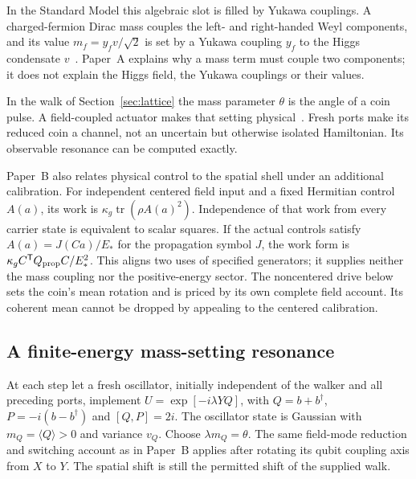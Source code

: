 \documentclass[12pt,a4paper]{article}
\theoremstyle{definition}
\theoremstyle{remark}
\begin{document}
In the Standard Model this algebraic slot is filled by Yukawa couplings. A charged-fermion Dirac mass couples the left- and right-handed Weyl components, and its value $m_f=y_fv/\sqrt2$ is set by a Yukawa coupling $y_f$ to the Higgs condensate $v$~\cite{PeskinSchroeder1995,WeinbergQFT2}. Paper~A explains why a mass term must couple two components; it does not explain the Higgs field, the Yukawa couplings or their values.

In the walk of Section~\ref{sec:lattice} the mass parameter $\theta$ is the angle of a coin pulse. A field-coupled actuator makes that setting physical~\cite{Liu2026QRAIFB}. Fresh ports make its reduced coin a channel, not an uncertain but otherwise isolated Hamiltonian. Its observable resonance can be computed exactly.

Paper~B also relates physical control to the spatial shell under an additional calibration. For independent centered field input and a fixed Hermitian control $A(a)$, its work is $\kappa_g\operatorname{tr}(\rho A(a)^2)$. Independence of that work from every carrier state is equivalent to scalar squares. If the actual controls satisfy $A(a)=J(Ca)/E_*$ for the propagation symbol $J$, the work form is $\kappa_g C^{\mathsf T}Q_{\rm prop}C/E_*^2$. This aligns two uses of specified generators; it supplies neither the mass coupling nor the positive-energy sector. The noncentered drive below sets the coin's mean rotation and is priced by its own complete field account. Its coherent mean cannot be dropped by appealing to the centered calibration.

\subsection{A finite-energy mass-setting resonance}
\label{sec:field-coin}

At each step let a fresh oscillator, initially independent of the walker and
all preceding ports, implement $U=\exp[-i\lambda YQ]$, with
$Q=b+b^\dagger$, $P=-i(b-b^\dagger)$ and $[Q,P]=2i$.
The oscillator state is Gaussian with $m_Q=\langle Q\rangle>0$ and variance
$v_Q$. Choose $\lambda m_Q=\theta$. The same field-mode reduction and switching
account as in Paper~B applies after rotating its qubit coupling axis from $X$
to $Y$. The spatial shift is still the permitted shift of the supplied walk.
\end{document}
